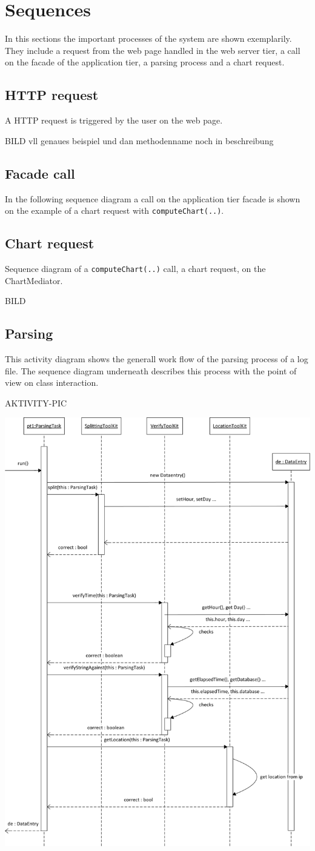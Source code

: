 \section{Sequences}
In this sections the important processes of the system are shown exemplarily. They include a request 
from the web page handled in the web server tier, a call on the facade of the application tier,
a parsing process and a chart request.

\subsection{HTTP request}
A HTTP request is triggered by the user on the web page.

BILD vll genaues beispiel und dan methodenname noch in beschreibung

\subsection{Facade call}
In the following sequence diagram a call on the application tier facade is shown 
on the example of a chart request with \texttt{computeChart(..)}.



\subsection{Chart request}
Sequence diagram of a \texttt{computeChart(..)} call, a chart request, on the ChartMediator.

BILD


\subsection{Parsing}
This activity diagram shows the generall work flow of the parsing process of a log file. 
The sequence diagram underneath describes this process with the point of view on class interaction.

AKTIVITY-PIC

\begin{center}
\includegraphics[width=0.7\linewidth]{Pictures/Seq/SeqParser.png}
\end{center}



   
